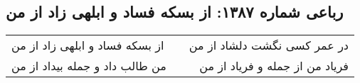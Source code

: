 \begin{center}
\section*{رباعی شماره ۱۳۸۷: از بسکه فساد و ابلهی زاد از من}
\label{sec:1387}
\begin{longtable}{l p{0.5cm} r}
از بسکه فساد و ابلهی زاد از من
&&
در عمر کسی نگشت دلشاد از من
\\
من طالب داد و جمله بیداد از من
&&
فریاد من از جمله و فریاد از من
\\
\end{longtable}
\end{center}
